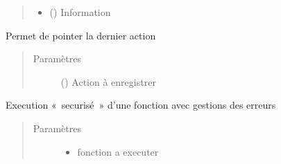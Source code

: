 \documentclass[letterpaper,10pt,french]{sphinxmanual}
\begin{document}
\begin{fulllineitems}
\begin{fulllineitems}
\begin{quote}
\begin{description}
\begin{itemize}
\item {} 
 () \textendash{} Information

\end{itemize}

\end{description}\end{quote}

\end{fulllineitems}


\begin{fulllineitems}
\label{\detokenize{classes/cfgloader:toolbox.logmng.CTracker.flag}}
Permet de pointer la dernier action
\begin{quote}\begin{description}
\item[{Paramètres}] \leavevmode
{} () \textendash{} Action à enregistrer

\end{description}\end{quote}

\end{fulllineitems}


\begin{fulllineitems}
\label{\detokenize{classes/cfgloader:toolbox.logmng.CTracker.fntracker}}
Execution « securisé » d’une fonction avec gestions des erreurs
\begin{quote}\begin{description}
\item[{Paramètres}] \leavevmode\begin{itemize}
\item {} 
 \textendash{} fonction a executer


\end{itemize}
\end{description}
\end{quote}
\end{fulllineitems}
\end{fulllineitems}
\end{document}
